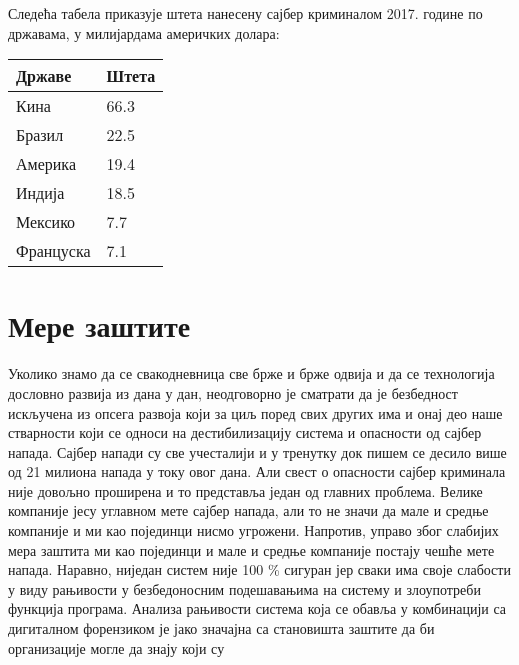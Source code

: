 \documentclass[a4paper]{article}
\begin{document}
	Следећа табела приказује штета нанесену сајбер криминалом 2017. године по државама, у милијардама америчких долара: 
	\begin{table}[h!]
		\centering
		\begin{tabular}{|l|l|}
			\hline
			Државе & Штета \\ \hline
			Кина & 66.3 \\ \hline
			Бразил & 22.5 \\ \hline
			Америка & 19.4 \\ \hline
			Индија & 18.5 \\ \hline
			Мексико & 7.7 \\ \hline
			Француска & 7.1 \\
			\hline
		\end{tabular}
	\end{table}
	\section{Мере заштите}
	\label{sec:MereZastite}
	Уколико знамо да се свакодневница све брже и брже одвија и да се технологија дословно развија из дана у дан, неодговорно је сматрати да је безбедност искључена из опсега развоја који за циљ поред свих других има и онај део наше стварности који се односи на дестибилизацију система и опасности од сајбер напада. Сајбер напади су све учесталији и у тренутку док пишем се десило више од 21 милиона напада у току овог дана. Али свест о опасности сајбер крими\-нала није довољно проширена и то представља један од главних пробле\-ма. Велике компаније јесу углавном мете сајбер напада, али то не значи да мале и средње компаније и ми као појединци нисмо угрожени. Напротив, управо због слабијих мера заштита ми као појединци и мале и средње компаније постају чешће мете напада. \newline
   	Наравно, ниједан систем није 100 \% сигуран јер сваки има своје слабо\-сти у виду рањивости у безбедоносним подешавањима на систему и
	злоупо\-треби функција програма. Анализа рањивости система која се обавља у комбинацији са дигиталном форензиком је јако значајна са
	станови\-шта заштите  да би организације могле да знају који су 
\end{document}
